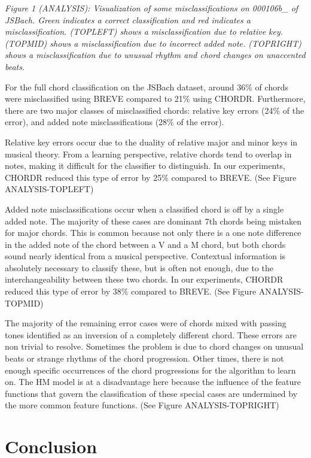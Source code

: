 \documentclass{article} %
\begin{document}

\emph{Figure 1 (ANALYSIS): Visualization of some misclassifications on 000106b\_ of JSBach. Green indicates a correct classification and red indicates a misclassification. (TOPLEFT) shows a misclassification due to relative key. (TOPMID) shows a misclassification due to incorrect added note. (TOPRIGHT) shows a misclassification due to unusual rhythm and chord changes on unaccented beats.}

For the full chord classification on the JSBach dataset, around 36\% of chords were misclassified using BREVE compared to 21\% using CHORDR. Furthermore, there are two major classes of misclassified chords: relative key errors (24\% of the error), and added note misclassifications (28\% of the error).

Relative key errors occur due to the duality of relative major and minor keys in musical theory. From a learning perspective, relative chords tend to overlap in notes, making it difficult for the classifier to distinguish. In our experiments, CHORDR reduced this type of error by 25\% compared to BREVE. (See Figure ANALYSIS-TOPLEFT)

Added note misclassifications occur when a classified chord is off by a single added note. The majority of these cases are dominant 7th chords being mistaken for major chords. This is common because not only there is a one note difference in the added note of the chord between a V and a M chord, but both chords sound nearly identical from a musical perspective. Contextual information is absolutely necessary to classify these, but is often not enough, due to the interchangeability between these two chords. In our experiments, CHORDR reduced this type of error by 38\% compared to BREVE. (See Figure ANALYSIS-TOPMID)

The majority of the remaining error cases were of chords mixed with passing tones identified as an inversion of a completely different chord. These errors are non trivial to resolve. Sometimes the problem is due to chord changes on unusual beats or strange rhythms of the chord progression. Other times, there is not enough specific occurrences of the chord progressions for the algorithm to learn on. The HM model is at a disadvantage here because the influence of the feature functions that govern the classification of these special cases are undermined by the more common feature functions. (See Figure ANALYSIS-TOPRIGHT)

\section{Conclusion}
\end{document}

